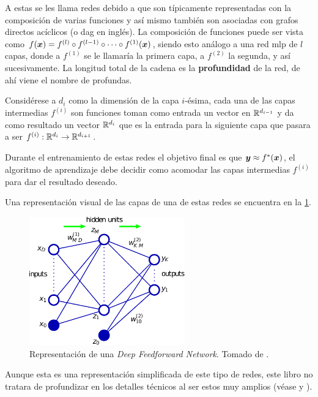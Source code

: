 A estas se les llama redes debido a que son típicamente representadas con la composición de varias funciones y así mismo también son asociadas con grafos directos acíclicos (o \gls{dag} en inglés). La composición de funciones puede ser vista como $f({\bm{x}}) = f^{(l)} \circ f^{(l-1)} \circ \cdots \circ f^{(1)}({\bm{x}})$, siendo esto análogo a una red \gls{mlp} de $l$ capas, donde a $f^{(1)}$ se le llamaría la primera capa, a $f^{(2)}$ la segunda, y así sucesivamente. La longitud total de la cadena es la \textbf{profundidad} de la red, de ahí viene el nombre de profundas.

Considérese a $d_i$ como la dimensión de la capa $i$-\'esima, cada una de las capas intermedias $f^{(i)}$ son funciones toman como entrada un vector en $\mathbb{R}^{d_{i-1}}$ y da como resultado un vector $\mathbb{R}^{d_{i}}$ que es la entrada para la siguiente capa que pasara a ser $f^{(i)}: \mathbb{R}^{d_{i}} \rightarrow \mathbb{R}^{d_{i+1}}$.

Durante el entrenamiento de estas redes el objetivo final es que ${\bm{y}} \approx f^{\ast}({\bm{x}})$, el algoritmo de aprendizaje debe decidir como acomodar las capas intermedias $f^{(i)}$ para dar el resultado deseado.

Una representación visual de las capas de una de estas redes se encuentra en la \cref{fig:deep-feedforward-network}.

\begin{figure}[H]
\centering
\includegraphics[width=0.6\textwidth]{Figures/deep-feedforward-network.pdf}
\decoRule
\caption[Representación de una \textsl{Deep Feedforward Network}]{Representación de una \textsl{Deep Feedforward Network}. Tomado de \cite{bishop-pattern-recognition}.}
\label{fig:deep-feedforward-network}
\end{figure}

Aunque esta es una representación simplificada de este tipo de redes, este libro no tratara de profundizar en los detalles técnicos al ser estos muy amplios (véase \cite{deeplearning} y \cite{bishop-pattern-recognition}).

